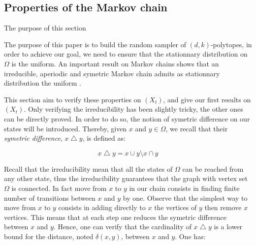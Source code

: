\documentclass[a4paper]{article}
\begin{document}
\subsection{Properties of the Markov chain}\label{Sec.Pr}

The purpose of this section

The purpose of this paper is to build the random sampler of $(d,k)$-polytopes, in order to achieve our goal, we need to ensure that the stationnary distribution on $\Omega$ is the uniform. An important result on Markov chains shows that an irreducible, aperiodic and symetric Markov chain admits as stationnary distribution the uniform \cite{LevinPeresWilmer2009}.

This section aim to verify these properties on $(X_t)$, and give our first results on $(X_t)$. Only verifying the irreducibility has been slightly tricky, the other ones can be directly proved. In order to do so, the notion of symetric difference on our states will be introduced. Thereby, given $x$ and $y \in \Omega$, we recall that their \textit{symetric difference}, $x \bigtriangleup y$, is defined as:

\begin{equation}
  x \bigtriangleup y = x \cup y \setminus x \cap y
\end{equation}

%

  Recall that the irreducibility mean that all the states of $\Omega$ can be reached from any other state, thus the irreducibility guarantees that the graph with vertex set $\Omega$ is connected. In fact move from $x$ to $y$ in our chain consists in finding finite number of transitions between $x$ and $y$ by one. Observe that the simplest way to move from $x$ to $y$ consists in adding directly to $x$ the vertices of $y$ then remove $x$ vertices. This means that at each step one reduces the symetric difference between $x$ and $y$. Hence, one can verify that the cardinality of $x \bigtriangleup y$ is a lower bound for the distance, noted $\delta(x,y)$, between $x$ and $y$. One has:
\end{document}
